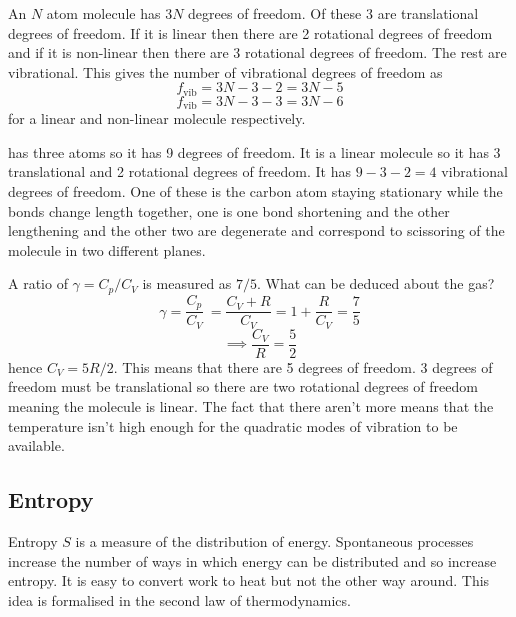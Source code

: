 \documentclass{article}
\begin{document}
    An \(N\) atom molecule has \(3N\) degrees of freedom.
    Of these 3 are translational degrees of freedom.
    If it is linear then there are 2 rotational degrees of freedom and if it is non-linear then there are 3 rotational degrees of freedom.
    The rest are vibrational.
    This gives the number of vibrational degrees of freedom as
    \[f_\text{vib} = 3N - 3 - 2 = 3N - 5\]
    \[f_\text{vib} = 3N - 3 - 3 = 3N - 6\]
    for a linear and non-linear molecule respectively.
    
    \example
     has three atoms so it has 9 degrees of freedom.
    It is a linear molecule so it has 3 translational and 2 rotational degrees of freedom.
    It has \(9 - 3 - 2 = 4\) vibrational degrees of freedom.
    One of these is the carbon atom staying stationary while the bonds change length together, one is one bond shortening and the other lengthening and the other two are degenerate and correspond to scissoring of the molecule in two different planes.
    
    \example
    A ratio of \(\gamma = C_p / C_V\) is measured as \(7/5\).
    What can be deduced about the gas?
    \[\gamma = \frac{C_p}{C_V}\ = \frac{C_V + R}{C_V} = 1 + \frac{R}{C_V} = \frac{7}{5}\]
    \[\implies \frac{C_V}{R} = \frac{5}{2}\]
    hence \(C_V = 5R/2\).
    This means that there are 5 degrees of freedom.
    3 degrees of freedom must be translational so there are two rotational degrees of freedom meaning the molecule is linear.
    The fact that there aren't more means that the temperature isn't high enough for the quadratic modes of vibration to be available.
    
    \subsection{Entropy}
    Entropy \(S\) is a measure of the distribution of energy.
    Spontaneous processes increase the number of ways in which energy can be distributed and so increase entropy.
    It is easy to convert work to heat but not the other way around.
    This idea is formalised in the second law of thermodynamics.
    
\end{document}
